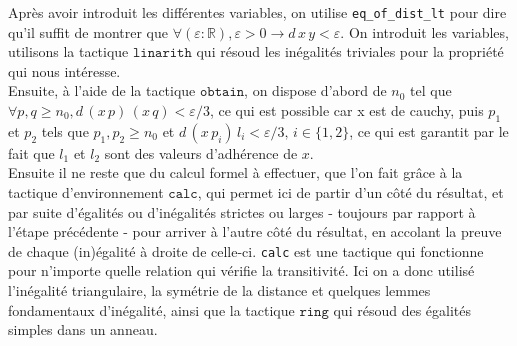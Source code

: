 Après avoir introduit les différentes variables, on utilise \texttt{eq\_of\_dist\_lt} pour dire qu'il suffit de montrer que $\forall (\varepsilon : \mathbb{R}), \varepsilon > 0 \to d \,x\,y < \varepsilon$. On introduit les variables, utilisons la tactique $\texttt{linarith}$ qui résoud les inégalités triviales pour la propriété qui nous intéresse. \\
Ensuite, à l'aide de la tactique $\texttt{obtain}$, on dispose d'abord de $n_0$ tel que $\forall p,q \geq n_0, d\, (x\, p)\, (x\, q) < \varepsilon /3$, ce qui est possible car x est de cauchy, puis $p_1$ et $p_2$ tels que $p_1 , p_2 \geq n_0$ et $d\,(x\,p_i)\,l_i < \varepsilon /3,\, i \in \{1,2\}$, ce qui est garantit par le fait que $l_1$ et $l_2$ sont des valeurs d'adhérence de $x$.\\
Ensuite il ne reste que du calcul formel à effectuer, que l'on fait grâce à la tactique d'environnement $\texttt{calc}$, qui permet ici de partir d'un côté du résultat, et par suite d'égalités ou d'inégalités strictes ou larges - toujours par rapport à l'étape précédente - pour arriver à l'autre côté du résultat, en accolant la preuve de chaque (in)égalité à droite de celle-ci. \texttt{calc} est une tactique qui fonctionne pour n'importe quelle relation qui vérifie la transitivité. Ici on a donc utilisé l'inégalité triangulaire, la symétrie de la distance et quelques lemmes fondamentaux d'inégalité, ainsi que la tactique $\texttt{ring}$ qui résoud des égalités simples dans un anneau.\\